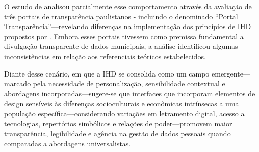 \documentclass[
	12pt,				%
	oneside,			%
	a4paper,			%
	english,			%
	brazil				%
	]{abntex2ppgsi}
\begin{document}


  

  
  

  O estudo de  analisou parcialmente esse comportamento através da avaliação de três portais de transparência paulistanos - incluindo o denominado ``Portal Transparência''---revelando diferenças na implementação dos princípios de IHD propostos por . Embora esses portais tivessem como premissa fundamental a divulgação transparente de dados municipais, a análise identificou algumas inconsistências em relação aos referenciais teóricos estabelecidos.

  Diante desse cenário, em que a IHD se consolida como um campo emergente---marcado pela necessidade de personalização, sensibilidade contextual e abordagens incorporadas---sugere-se que interfaces que incorporam elementos de design sensíveis às diferenças socioculturais e econômicas intrínsecas a uma população específica---considerando variações em letramento digital, acesso a tecnologias, repertórios simbólicos e relações de poder---promovem maior transparência, legibilidade e agência na gestão de dados pessoais quando comparadas a abordagens universalistas.
  
\end{document}

